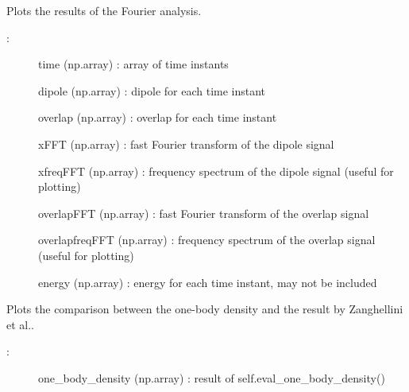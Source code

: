 \documentclass[letterpaper,10pt,english]{sphinxmanual}
\begin{document}
\begin{fulllineitems}

\begin{fulllineitems}
\label{\detokenize{index:do.GHF.plot_fourier_analysis}}
Plots the results of the Fourier analysis.
\begin{description}
\item[{:}] \leavevmode
time (np.array) : array of time instants

dipole (np.array) : dipole for each time instant

overlap (np.array) : overlap for each time instant

xFFT (np.array) : fast Fourier transform of the dipole signal

xfreqFFT (np.array) : frequency spectrum of the dipole signal (useful for plotting)

overlapFFT (np.array) : fast Fourier transform of the overlap signal

overlapfreqFFT (np.array) : frequency spectrum of the overlap signal (useful for plotting)

energy (np.array) : energy for each time instant, may not be included

\end{description}

\end{fulllineitems}


\begin{fulllineitems}
\label{\detokenize{index:do.GHF.plot_one_body_density}}
Plots the comparison between the one-body density and the result by Zanghellini et al..
\begin{description}
\item[{:}] \leavevmode
one\_body\_density (np.array) : result of self.eval\_one\_body\_density()

\end{description}

\end{fulllineitems}


\end{fulllineitems}
\end{document}
